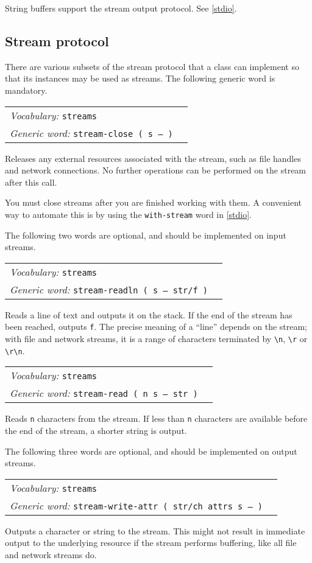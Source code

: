 \documentclass{book}
\newcommand{\vocabulary}[1]{\emph{Vocabulary:} \texttt{#1}&\\}
\newcommand{\genericword}[2]{\index{\texttt{#1}}\emph{Generic word:} \texttt{#2}&\\}
\newcommand{\wordtable}[1]{

\begin{tabularx}{12cm}[t]{lX}
\hline
#1
\hline
\end{tabularx}

}
\begin{document}
String buffers support the stream output protocol. See \ref{stdio}.

\subsection{\label{stream-protocol}Stream protocol}

There are various subsets of the stream protocol that a class can implement so that its instances may be used as streams. The following generic word is mandatory.

\wordtable{
\vocabulary{streams}
\genericword{stream-close}{stream-close ( s -- )}
}
Releases any external resources associated with the stream, such as file handles and network connections. No further operations can be performed on the stream after this call.

You must close streams after you are finished working with them. A convenient way to automate this is by using the \texttt{with-stream} word in \ref{stdio}.

The following two words are optional, and should be implemented on input streams.
\wordtable{
\vocabulary{streams}
\genericword{stream-readln}{stream-readln ( s -- str/f )}
}
Reads a line of text and outputs it on the stack. If the end of the stream has been reached, outputs \texttt{f}. The precise meaning of a ``line'' depends on the stream; with file and network streams, it is a range of characters terminated by \verb|\n|, \verb|\r| or \verb|\r\n|.
\wordtable{
\vocabulary{streams}
\genericword{stream-read}{stream-read ( n s -- str )}
}
Reads \texttt{n} characters from the stream. If less than \texttt{n} characters are available before the end of the stream, a shorter string is output.

The following three words are optional, and should be implemented on output streams.

\wordtable{
\vocabulary{streams}
\genericword{stream-write-attr}{stream-write-attr ( str/ch attrs s -- )}
}
Outputs a character or string to the stream. This might not result in immediate output to the underlying resource if the stream performs buffering, like all file and network streams do. 
\end{document}
